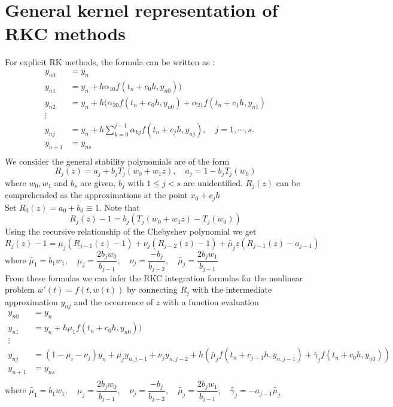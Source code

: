 \documentclass{article}
\theoremstyle{theorem}
\theoremstyle{definition}
\begin{document}
\section{General kernel representation of RKC methods}
For explicit RK methods, the formula can be written as : $$ \begin{aligned}
y_{n0}&=y_n\\ 
y_{n1}&=y_n + h \alpha_{10}f(t_n+c_0h,y_{n0}))\\ 
y_{n2}&=y_n + h (\alpha_{20}f(t_n+c_0h,y_{n0})+\alpha_{21}f(t_n+c_1h,y_{n1})\\ 
\vdots \\
y_{nj}&=y_n + h \sum_{k=0}^{j-1}\alpha_{kj}f(t_n+c_jh,y_{nj}) ,\quad j=1,\cdots, s. \\
y_{n+1}&=y_{ns}\\ 
\end{aligned}$$
We consider the general stability polynomials are of the form
$$R_j(z)=a_j+b_jT_j(w_0+w_1z), \quad a_j=1-b_jT_j(w_0)$$ where $w_0,w_1$ and $b_s$ are given, $b_j$ with $1 \le j < s$ are unidentified. $R_j(z)$ can be comprehended as the approximations at the point $x_0+c_jh$\\ Set $R_0(z)=a_0+b_0 \equiv 1$. 
Note that $$R_j(z)-1=b_j(T_j(w_0+w_1z)-T_j(w_0))$$
Using the recursive relationship of the Chebyshev polynomial we get
$$R_j(z)-1=\mu_j(R_{j-1}(z)-1)+\nu_j(R_{j-2}(z)-1)+\tilde{\mu_{j}}z(R_{j-1}(z)-a_{j-1})$$ where $\tilde{\mu_{1}} =b_1w_1, \quad \mu_j=\dfrac{2b_jw_0}{b_{j-1}}, \quad \nu_j=\dfrac{-b_j}{b_{j-2}},\quad \tilde{\mu_j}=\dfrac{2b_jw_1}{b_{j-1}}$ \\
From these formulas we can infer the RKC integration formulas for the nonlinear problem $w'(t) = f(t, w(t))$ by connecting $R_j$ with the intermediate approximation $y_{nj}$ and the occurrence of $z$ with a function evaluation
$$\begin{aligned}
y_{n0}&=y_n\\ 
y_{n1}&=y_n + h \mu_{1}f(t_n+c_0h,y_{n0}))\\ 
\vdots \\
y_{nj}&=(1-\mu_i-\nu_j)y_n+\mu_jy_{n,j-1}+\nu_j y_{n,j-2} + h \left( \tilde{\mu_{j}}f(t_n+c_{j-1}h,y_{n,j-1}) +\tilde{\gamma_j}f(t_n+c_0h,y_{n0})\right )\\
y_{n+1}&=y_{ns}\\ 
\end{aligned}$$
where $\tilde{\mu_{1}} =b_1w_1, \quad \mu_j=\dfrac{2b_jw_0}{b_{j-1}}, \quad \nu_j=\dfrac{-b_j}{b_{j-2}},\quad \tilde{\mu_j}=\dfrac{2b_jw_1}{b_{j-1}}, \quad \tilde{\gamma _j}=-a_{j-1} \tilde{\mu_j}$ \\
\end{document}
